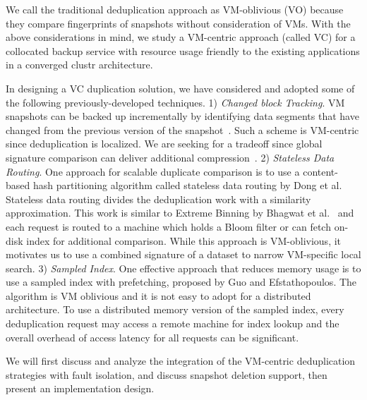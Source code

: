 We call the traditional deduplication approach as   VM-oblivious (VO)
because they compare fingerprints of snapshots without consideration of VMs.
With the above  considerations in mind, we study a 
VM-centric approach (called VC)
for a collocated backup service with resource usage friendly
to the existing applications in a converged clustr architecture.  

In designing a VC duplication solution, we have considered and adopted some of
the following previously-developed techniques.
1)
{\em Changed block Tracking}.
VM snapshots can be  backed up  incrementally by identifying data segments that have
changed from the previous version of the snapshot~\cite{Clements2009,Vrable2009,TanIPDPS2011}.
Such a scheme  is  VM-centric since deduplication is localized. 
We are seeking for a tradeoff since 
global signature comparison can deliver additional compression~\cite{Guo2011,Dong2011,extreme_binning09}.
2) {\em Stateless  Data Routing}.
One approach for scalable duplicate comparison is to use a content-based hash
partitioning algorithm called stateless data routing by Dong et al.~\cite{Dong2011} 
Stateless data routing divides the deduplication work with a similarity approximation. This work 
is similar to Extreme Binning by Bhagwat et al.~\cite{extreme_binning09} and 
each request is routed  to a machine which holds
a Bloom filter  or can fetch on-disk index for additional comparison.
While this approach is VM-oblivious, it motivates us to  use  a combined signature of a dataset to narrow
VM-specific local search.
3) {\em Sampled Index}.
One effective approach that reduces memory usage is 
to use a sampled index with prefetching, proposed  by Guo and Efstathopoulos\cite{Guo2011}. 
The algorithm is VM oblivious and it is not easy  to adopt for a distributed architecture. 
To use a distributed memory version of the sampled index, every deduplication request
may access a remote machine for index lookup and the overall overhead of access latency for all requests
can be significant.  


We will first discuss and analyze the integration of the VM-centric deduplication strategies with fault isolation, 
and discuss snapshot deletion support, then present an implementation design. 
